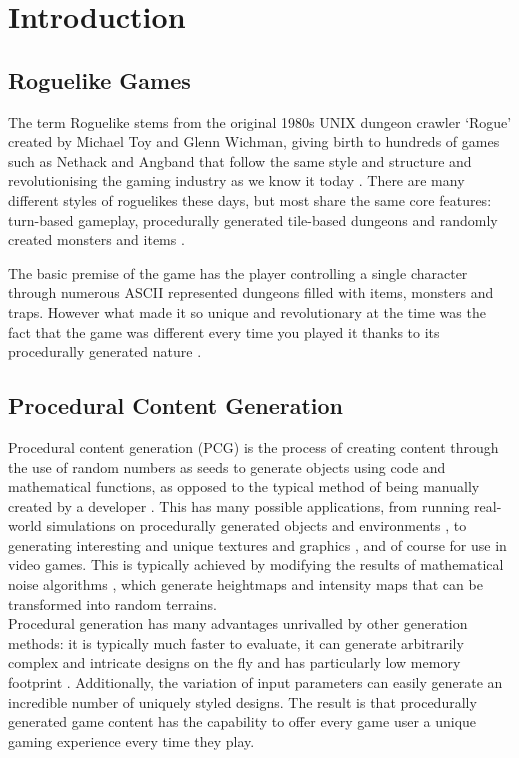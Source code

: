 \documentclass[12pt,a4paper]{article}
\begin{document}
\section{Introduction}
\subsection{Roguelike Games} \label{ssec:rogue}


The term Roguelike stems from the original 1980s UNIX dungeon crawler `Rogue' created by Michael Toy and Glenn Wichman, giving birth to hundreds of games such as Nethack and Angband that follow the same style and structure and revolutionising the gaming industry as we know it today \cite{Dunhack}. There are many different styles of roguelikes these days, but most share the same core features: turn-based gameplay, procedurally generated tile-based dungeons and randomly created monsters and items \cite{pgcbook}. 

The basic premise of the game has the player controlling a single character through numerous ASCII represented dungeons filled with items, monsters and traps. However what made it so unique and revolutionary at the time was the fact that the game was different every time you played it thanks to its procedurally generated nature \cite{roguebasin}. 



\subsection{Procedural Content Generation} \label{ssec:PCG}

Procedural content generation (PCG) is the process of creating content through the use of random numbers as seeds to generate objects using code and mathematical functions, as opposed to the typical method of being manually created by a developer \cite{pgcbook}. This has many possible applications, from running real-world simulations on procedurally generated objects and environments \cite{vast}, to generating interesting and unique textures and graphics \cite{imagesynth}, and of course for use in video games. This is typically achieved by modifying the results of mathematical noise algorithms \cite{pgcbookch4}, which generate heightmaps and intensity maps that can be transformed into random terrains. \\

Procedural generation has many advantages unrivalled by other generation methods: it is typically much faster to evaluate, it can generate arbitrarily complex and intricate designs on the fly and has particularly low memory footprint \cite{surveyPNF}. Additionally, the variation of input parameters can easily generate an incredible number of uniquely styled designs. The result is that procedurally generated game content has the capability to offer every game user a unique gaming experience every time they play. \\
\end{document}
